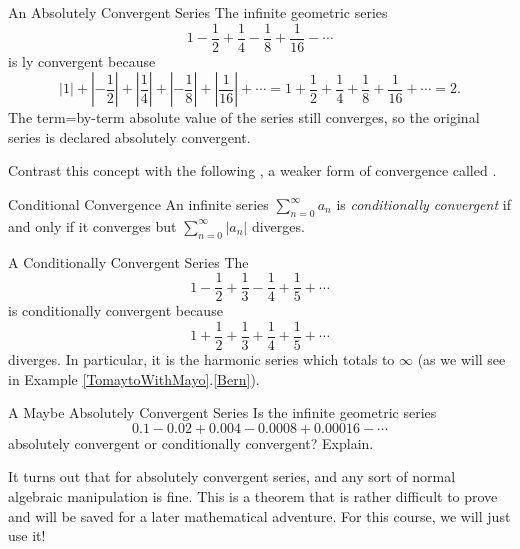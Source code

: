 \begin{example}{An Absolutely Convergent Series}
The infinite geometric series $$1-\frac{1}{2}+\frac{1}{4}-\frac{1}{8}+\frac{1}{16}-\cdots $$ is ly convergent because $$|1|+\left|-\frac{1}{2}\right|+\left|\frac{1}{4}\right|+\left|-\frac{1}{8}\right|+\left|\frac{1}{16}\right|+\cdots=1+\frac{1}{2}+\frac{1}{4}+\frac{1}{8}+\frac{1}{16}+\cdots=2.  $$ The term=by-term absolute value of the series still converges, so the original series is declared absolutely convergent.
\end{example}

Contrast this concept with the following , a weaker form of convergence called .

\begin{definition}{Conditional Convergence }
An infinite series $\sum_{n=0}^\infty a_n$ is \emph{conditionally convergent} if and only if it converges but $\sum_{n=0}^\infty \left| a_n \right|$ diverges.
\end{definition}

\begin{example}{A Conditionally Convergent Series}
The  $$1-\frac{1}{2}+\frac{1}{3}-\frac{1}{4}+\frac{1}{5}+\cdots $$ is conditionally convergent because $$1+\frac{1}{2}+\frac{1}{3}+\frac{1}{4}+\frac{1}{5}+\cdots $$ diverges. In particular, it is the harmonic series which totals to $\infty$ (as we will see in Example \ref{TomaytoWithMayo}.\ref{Bern}).  
\end{example}

\begin{exercise}{A Maybe Absolutely Convergent Series \Coffeecup \Coffeecup}
Is the infinite geometric series $$0.1-0.02+0.004-0.0008+0.00016-\cdots $$ absolutely convergent or conditionally convergent?  Explain.
\end{exercise}

It turns out that for absolutely convergent series,  and any sort of normal algebraic manipulation is fine.  This is a theorem that is rather difficult to prove and will be saved for a later mathematical adventure.  For this course, we will just use it!
